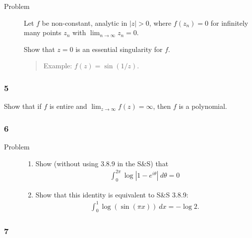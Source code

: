 \begin{description}
\item[Problem]
Let \(f\) be non-constant, analytic in
\({\left\lvert {z} \right\rvert} > 0\), where \(f(z_n) = 0\) for
infinitely many points \(z_n\) with \(\lim_{n\to\infty} z_n = 0\).

Show that \(z=0\) is an essential singularity for \(f\).

\begin{quote}
Example: \(f(z) = \sin(1/z)\).
\end{quote}
\end{description}

\hypertarget{section-77}{%
\subsubsection{5}\label{section-77}}

\begin{description}
\tightlist
\item[Problem]
Show that if \(f\) is entire and \(\lim_{z\to\infty}f(z) = \infty\),
then \(f\) is a polynomial.
\end{description}

\hypertarget{section-78}{%
\subsubsection{6}\label{section-78}}

\begin{description}
\item[Problem]
\hfill

\begin{enumerate}
\def\labelenumi{\alph{enumi}.}
\tightlist
\item
  Show (without using 3.8.9 in the S\&S) that
  \begin{align*}
  \int_0^{2\pi} \log{\left\lvert {1 - e^{i\theta}} \right\rvert}~d\theta = 0
  \end{align*}
\item
  Show that this identity is equivalent to S\&S 3.8.9:
  \begin{align*}
  \int_0^1 \log(\sin(\pi x)) ~dx = -\log 2
  .\end{align*}
\end{enumerate}
\end{description}

\hypertarget{section-79}{%
\subsubsection{7}\label{section-79}}

